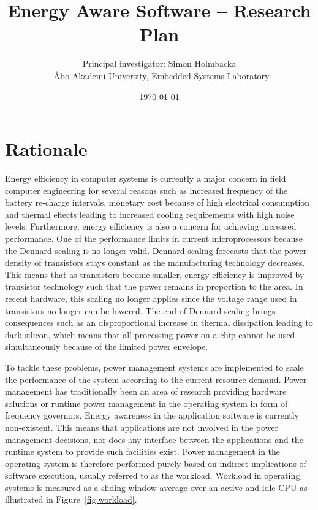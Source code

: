 \documentclass{article}
\title{Energy Aware Software -- Research Plan} %
\author{Principal investigator: Simon Holmbacka\\ \AA{}bo Akademi University, Embedded Systems Laboratory} %
\date{\today} %
\begin{document}
\maketitle %

\section{Rationale}
Energy efficiency in computer systems is currently a major concern in field computer engineering for several reasons such as increased frequency of the battery re-charge intervals, 
monetary cost because of high electrical consumption and thermal effects leading to increased cooling requirements with high noise levels. 
Furthermore, energy efficiency is also a concern for achieving increased performance.
One of the performance limits in current microprocessors because the Dennard scaling \cite{Dennard:74} is no longer valid. 
Dennard scaling forecasts that the power density of transistors stays constant as the manufacturing technology decreases. 
This means that as transistors become smaller, energy efficiency is improved by transistor technology such that the power remains in proportion to the area. 
In recent hardware, this scaling no longer applies since the voltage range used in transistors no longer can be lowered. 
The end of Dennard scaling brings consequences such as an disproportional increase in thermal dissipation leading to dark silicon, 
which means that all processing power on a chip cannot be used simultaneously because of the limited power envelope.


To tackle these problems, power management systems are implemented to scale the performance of the system according to the current resource demand. 
Power management has traditionally been an area of research providing hardware solutions or runtime power management in the operating system in form of frequency governors. 
Energy awareness in the application software is currently non-existent. This means that applications are not involved in the power management decisions, 
nor does any interface between the applications and the runtime system to provide such facilities exist. 
Power management in the operating system is therefore performed purely based on indirect implications of software execution, usually referred to as the workload. 
Workload in operating systems is measured as a sliding window average over an active and idle CPU as illustrated in Figure~\ref{fig:workload}. 
\end{document}
